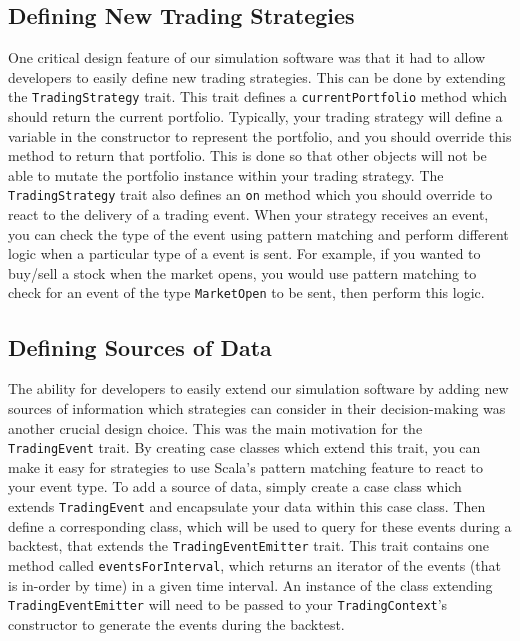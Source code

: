 \subsection{Defining New Trading Strategies}

One critical design feature of our simulation software was that it had to allow developers to easily define new trading strategies.
This can be done by extending the \texttt{Trading\-Strategy} trait.
This trait defines a \texttt{currentPortfolio} method which should return the current portfolio.
Typically, your trading strategy will define a variable in the constructor to represent the portfolio, and you should override this method to return that portfolio.
This is done so that other objects will not be able to mutate the portfolio instance within your trading strategy.
The \texttt{Trading\-Strategy} trait also defines an \texttt{on} method which you should override to react to the delivery of a trading event.
When your strategy receives an event, you can check the type of the event using pattern matching and perform different logic when a particular type of a event is sent.
For example, if you wanted to buy/sell a stock when the market opens, you would use pattern matching to check for an event of the type \texttt{Market\-Open} to be sent, then perform this logic.

\subsection{Defining Sources of Data}

The ability for developers to easily extend our simulation software by adding new sources of information which strategies can consider in their decision-making was another crucial design choice.
This was the main motivation for the \texttt{Trading\-Event} trait.
By creating case classes which extend this trait, you can make it easy for strategies to use Scala's pattern matching feature to react to your event type.
To add a source of data, simply create a case class which extends \texttt{Trading\-Event} and encapsulate your data within this case class.
Then define a corresponding class, which will be used to query for these events during a backtest, that extends the \texttt{Trading\-Event\-Emitter} trait.
This trait contains one method called \texttt{events\-For\-Interval}, which returns an iterator of the events (that is in-order by time) in a given time interval.
An instance of the class extending \texttt{Trading\-Event\-Emitter} will need to be passed to your \texttt{Trading\-Context}'s constructor to generate the events during the backtest.

